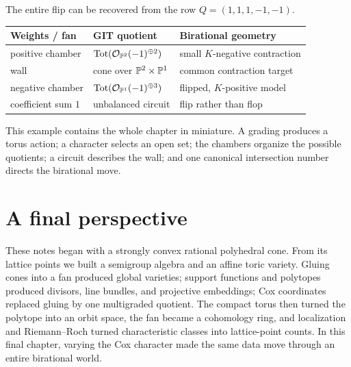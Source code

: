 \begin{threedictionaries}
The entire flip can be recovered from the row
\(Q=(1,1,1,-1,-1)\).

\medskip

\begin{center}
\small
\begin{tabularx}{\linewidth}{@{}
  >{\raggedright\arraybackslash}X
  >{\raggedright\arraybackslash}X
  >{\raggedright\arraybackslash}X@{}}
\toprule
\textbf{Weights / fan}
&\textbf{GIT quotient}
&\textbf{Birational geometry}
\\
\midrule
positive chamber
&\(\operatorname{Tot}(\mathcal O_{\mathbb{P}^2}(-1)^{\oplus2})\)
&small \(K\)-negative contraction
\\
wall
&cone over \(\mathbb{P}^2\times\mathbb{P}^1\)
&common contraction target
\\
negative chamber
&\(\operatorname{Tot}(\mathcal O_{\mathbb{P}^1}(-1)^{\oplus3})\)
&flipped, \(K\)-positive model
\\
coefficient sum \(1\)
&unbalanced circuit
&flip rather than flop
\\
\bottomrule
\end{tabularx}
\end{center}
\end{threedictionaries}

This example contains the whole chapter in miniature.  A grading
produces a torus action; a character selects an open set; the chambers
organize the possible quotients; a circuit describes the wall; and
one canonical intersection number directs the birational move.

\clearpage
\section*{A final perspective}

These notes began with a strongly convex rational polyhedral cone.
From its lattice points we built a semigroup algebra and an affine
toric variety.  Gluing cones into a fan produced global varieties;
support functions and polytopes produced divisors, line bundles, and
projective embeddings; Cox coordinates replaced gluing by one
multigraded quotient.  The compact torus then turned the polytope into
an orbit space, the fan became a cohomology ring, and localization and
Riemann--Roch turned characteristic classes into lattice-point counts.
In this final chapter, varying the Cox character made the same data
move through an entire birational world.

